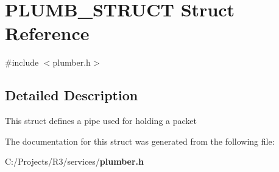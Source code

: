 \section{PLUMB\_\-STRUCT Struct Reference}
\label{struct_p_l_u_m_b___s_t_r_u_c_t}


{\ttfamily \#include $<$plumber.h$>$}

\subsection{Detailed Description}
This struct defines a pipe used for holding a packet 

The documentation for this struct was generated from the following file:\begin{DoxyCompactItemize}
\item 
C:/Projects/R3/services/{\bf plumber.h}\end{DoxyCompactItemize}
